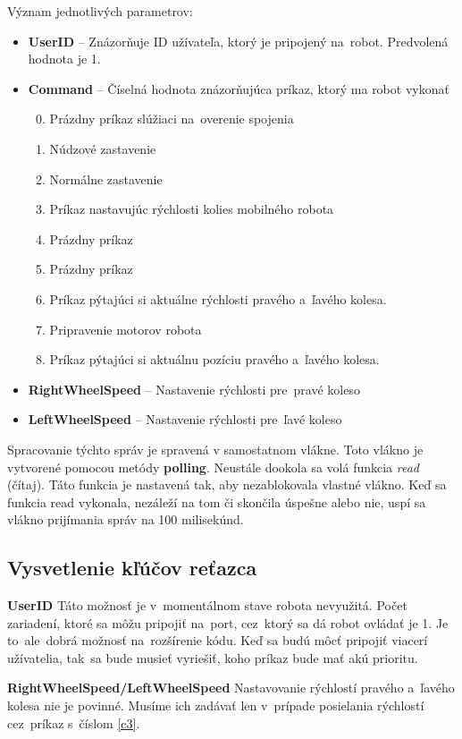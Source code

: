 	\noindent Význam jednotlivých parametrov:
	\begin{itemize}
		\item \textbf{UserID} -- Znázorňuje ID užívateľa, ktorý je pripojený na~robot. Predvolená hodnota je 1.
		\item \textbf{Command} --  Číselná hodnota znázorňujúca príkaz, ktorý ma robot vykonať
			\begin{enumerate}
				\setcounter{enumi}{-1}
				\item \label{c0} Prázdny príkaz slúžiaci na~overenie spojenia
				\item \label{c1} Núdzové zastavenie
				\item \label{c2} Normálne zastavenie
				\item \label{c3} Príkaz nastavujúc rýchlosti kolies mobilného robota
				\item \label{c4} Prázdny príkaz
				\item \label{c5} Prázdny príkaz
				\item \label{c6} Príkaz pýtajúci si aktuálne rýchlosti pravého a~ľavého kolesa.
				\item \label{c7} Pripravenie motorov robota
				\item \label{c8} Príkaz pýtajúci si aktuálnu pozíciu pravého a~ľavého kolesa.
			\end{enumerate}
		\item \textbf{RightWheelSpeed} -- Nastavenie rýchlosti pre~pravé koleso
		\item \textbf{LeftWheelSpeed} -- Nastavenie rýchlosti pre~ľavé koleso
	\end{itemize}

	Spracovanie týchto správ je spravená v samostatnom vlákne. Toto vlákno je vytvorené pomocou metódy \textbf{polling}.
	Neustále dookola sa volá funkcia \textit{read} (čítaj). Táto funkcia je nastavená tak, aby nezablokovala vlastné vlákno.
	Keď sa funkcia read vykonala, nezáleží na tom či skončila úspešne alebo nie, uspí sa vlákno prijímania správ na 100 milisekúnd.

\subsection{Vysvetlenie kľúčov reťazca}

\noindent \textbf{UserID} \newline
\indent Táto možnosť je v~momentálnom stave robota nevyužitá. Počet zariadení, ktoré sa môžu pripojiť na~port, cez~ktorý sa dá robot ovládať
je 1. Je to~ale~dobrá možnosť na~rozšírenie kódu. Keď sa budú môcť pripojiť viacerí užívatelia, tak~sa bude musieť vyriešiť, koho príkaz
bude mať akú prioritu. \newline

\noindent \textbf{RightWheelSpeed/LeftWheelSpeed} \newline
\indent Nastavovanie rýchlostí pravého a~ľavého kolesa nie je povinné. Musíme ich zadávať len v~prípade posielania rýchlostí
cez~príkaz s~číslom \ref{c3}.
